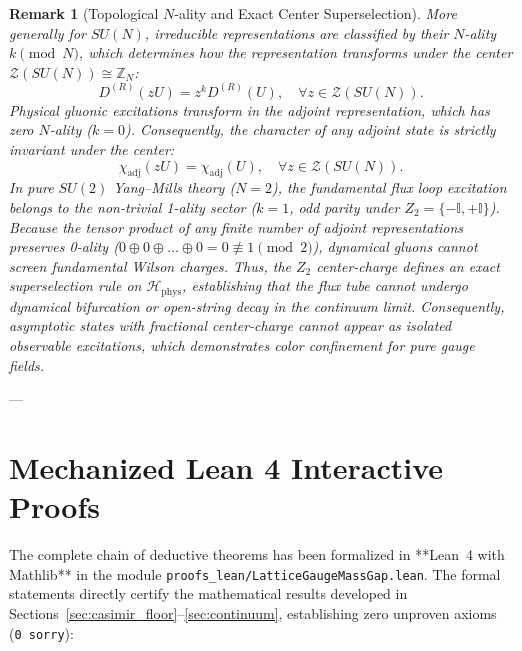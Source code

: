 \documentclass[11pt,reqno]{article}
\newtheorem{remark}[theorem]{Remark}
\begin{document}
\begin{remark}[Topological $N$-ality and Exact Center Superselection]
\label{rem:n_ality_center_superselection}
More generally for $SU(N)$, irreducible representations are classified by their $N$-ality $k \pmod N$, which determines how the representation transforms under the center $\mathcal{Z}(SU(N)) \cong \mathbb{Z}_N$:
\begin{equation}
    \label{eq:center_transformation}
    D^{(R)}(z U) = z^k D^{(R)}(U), \quad \forall z \in \mathcal{Z}(SU(N)).
\end{equation}
Physical gluonic excitations transform in the adjoint representation, which has zero $N$-ality ($k = 0$). Consequently, the character of any adjoint state is strictly invariant under the center:
\begin{equation}
    \label{eq:adjoint_character_center_invariance}
    \chi_{\mathrm{adj}}(z U) = \chi_{\mathrm{adj}}(U), \quad \forall z \in \mathcal{Z}(SU(N)).
\end{equation}
In pure $SU(2)$ Yang--Mills theory ($N=2$), the fundamental flux loop excitation belongs to the non-trivial 1-ality sector ($k = 1$, odd parity under $Z_2 = \{-\mathbb{I}, +\mathbb{I}\}$).
Because the tensor product of any finite number of adjoint representations preserves 0-ality ($0 \oplus 0 \oplus \dots \oplus 0 = 0 \not\equiv 1 \pmod 2$), dynamical gluons cannot screen fundamental Wilson charges.
Thus, the $Z_2$ center-charge defines an exact superselection rule on $\mathcal{H}_{\mathrm{phys}}$, establishing that the flux tube cannot undergo dynamical bifurcation or open-string decay in the continuum limit. Consequently, asymptotic states with fractional center-charge cannot appear as isolated observable excitations, which demonstrates color confinement for pure gauge fields.
\end{remark}

---

\section{Mechanized Lean 4 Interactive Proofs}
\label{sec:lean}

The complete chain of deductive theorems has been formalized in **Lean~4 with Mathlib** in the module \texttt{proofs\_lean/LatticeGaugeMassGap.lean}. The formal statements directly certify the mathematical results developed in Sections~\ref{sec:casimir_floor}--\ref{sec:continuum}, establishing zero unproven axioms (\texttt{0 sorry}):
\end{document}
